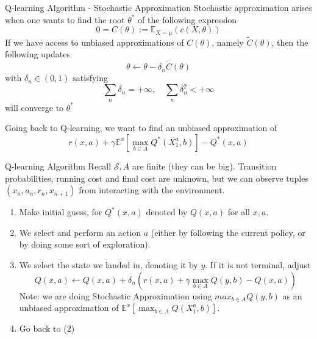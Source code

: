\documentclass[usenames,handout,aspectratio=169]{beamer}
\newtheorem{remark}{Remark}[theorem]
\begin{document}
\begin{frame}{Q-learning Algorithm - Stochastic Approximation}
Stochastic approximation arises when one wants to find the root $\theta^*$ of the following expression
\[
0 = C(\theta) := \mathbb E_{X\sim \mu} (c(X,\theta))
\]
If we have access to unbiased approximations of $C(\theta)$, namely $\tilde C(\theta)$, then the following updates
\[
\theta \leftarrow \theta - \delta_n \tilde C(\theta) 
\]
 with $\delta_n\in(0,1)$ satisfying
\[
\sum_n \delta_n = +\infty, \quad \sum_n \delta_n^2 < +\infty
\]
will converge to $\theta^*$

Going back to Q-learning, we want to find an unbiased approximation of
\[
r(x,a) + \gamma \mathbb E^x [\max_{b\in A}Q^*(X^a_1,b)] - Q^*(x,a)
\]
%
\end{frame}

\begin{frame}{Q-learning Algorithm}
Recall $\mathcal S, A$ are finite (they can be big). Transition probabilities, running cost and final cost are unknown, but we can observe tuples $(x_n, a_n, r_n,x_{n+1})$ from interacting with the environment. 
\begin{enumerate}
	\item Make initial guess, for $Q^*(x,a)$ denoted by $Q(x,a)$ for all $x,a$.
	\item We select and perform an action $a$ (either by following the current policy, or by doing some sort of exploration).
	\item We select the state we landed in, denoting it by $y$. If it is not terminal, adjust
	\[
	Q(x, a) \leftarrow Q(x, a) + \delta_n \left( r(x,a) + \gamma \max_{b\in A}Q(y,b) - Q(x,a)  \right)
	\]
	Note: we are doing Stochastic Approximation using $max_{b\in A}Q(y,b)$ as an unbiased approximation of $\mathbb E^x [\max_{b\in A}Q(X^a_1,b)]$.
	\item Go back to (2)
\end{enumerate}
\end{frame}
\end{document}
